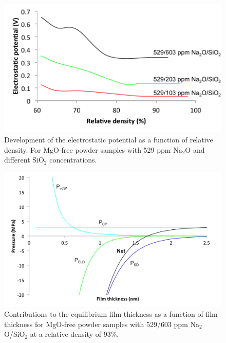 \newpage
\begin{figure}[H]
	\centering
	\includegraphics[scale=0.8]{Chapter-4/Figures/Figure6.png}
	\caption{Development of the electrostatic potential as a function of relative density. For MgO-free powder samples with 529 ppm Na$_{2}$O and different SiO$_{2}$ concentrations.}
	\label{Ch4-figure:Figure6}
\end{figure}

\newpage
\begin{figure}[H]
	\centering
	\includegraphics[width=\textwidth]{Chapter-4/Figures/Figure7.png}
	\caption{Contributions to the equilibrium film thickness as a function of film thickness for MgO-free powder samples with 529/603 ppm Na$_{2}$O/SiO$_{2}$ at a relative density of 93\%.}
	\label{Ch4-figure:Figure7}
\end{figure}

